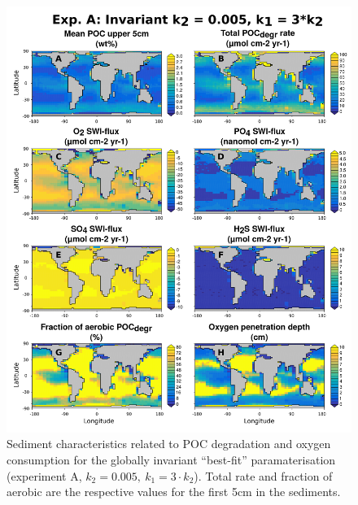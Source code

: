 \documentclass[gmd, manuscript]{copernicus}
\begin{document}
\begin{figure}[htbp]
\begin{center}
	\includegraphics[width=1.0\textwidth]{figures/OMEN-GENIE-Exp/0_1707_INVARIANT_SED_PROPS_AND_FLUXES_0808_LINES.pdf}
	\caption{Sediment characteristics related to POC degradation and oxygen consumption for the globally invariant ``best-fit'' paramaterisation 
	(experiment A, $k_2= 0.005,\ k_1 = 3 \cdot k_2$).
	Total  rate and fraction of aerobic  are the respective values for the first 5cm in the sediments. 
	}\label{fig:OMEN_GENIE_best_fit_invariant}
\end{center}
\end{figure}

% 
% 
\end{document}

